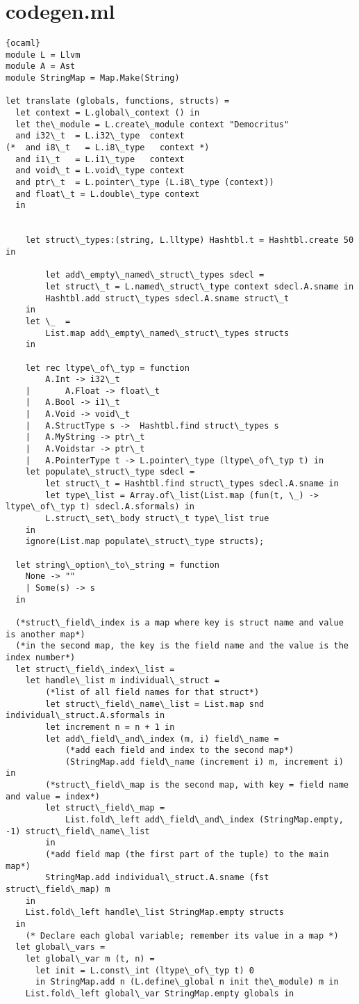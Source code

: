 \section{codegen.ml}
\begin{lstlisting}{ocaml}
module L = Llvm
module A = Ast
module StringMap = Map.Make(String)

let translate (globals, functions, structs) =
  let context = L.global\_context () in
  let the\_module = L.create\_module context "Democritus"
  and i32\_t  = L.i32\_type  context
(*  and i8\_t   = L.i8\_type   context *)
  and i1\_t   = L.i1\_type   context
  and void\_t = L.void\_type context
  and ptr\_t  = L.pointer\_type (L.i8\_type (context)) 
  and float\_t = L.double\_type context
  in
		

	let struct\_types:(string, L.lltype) Hashtbl.t = Hashtbl.create 50 in

        let add\_empty\_named\_struct\_types sdecl =
		let struct\_t = L.named\_struct\_type context sdecl.A.sname in
		Hashtbl.add struct\_types sdecl.A.sname struct\_t
	in
	let \_  =
		List.map add\_empty\_named\_struct\_types structs 
	in

	let rec ltype\_of\_typ = function
		A.Int -> i32\_t
	|       A.Float -> float\_t
	| 	A.Bool -> i1\_t
 	|	A.Void -> void\_t
	| 	A.StructType s ->  Hashtbl.find struct\_types s
	|	A.MyString -> ptr\_t 
	| 	A.Voidstar -> ptr\_t 
	|	A.PointerType t -> L.pointer\_type (ltype\_of\_typ t) in 
	let populate\_struct\_type sdecl = 
		let struct\_t = Hashtbl.find struct\_types sdecl.A.sname in
		let type\_list = Array.of\_list(List.map (fun(t, \_) -> ltype\_of\_typ t) sdecl.A.sformals) in
		L.struct\_set\_body struct\_t type\_list true
	in 
    ignore(List.map populate\_struct\_type structs);
  
  let string\_option\_to\_string = function
	None -> ""
	| Some(s) -> s
  in
	
  (*struct\_field\_index is a map where key is struct name and value is another map*)
  (*in the second map, the key is the field name and the value is the index number*)
  let struct\_field\_index\_list =
	let handle\_list m individual\_struct = 
		(*list of all field names for that struct*) 
		let struct\_field\_name\_list = List.map snd individual\_struct.A.sformals in
		let increment n = n + 1 in
		let add\_field\_and\_index (m, i) field\_name =
			(*add each field and index to the second map*)
			(StringMap.add field\_name (increment i) m, increment i) in
		(*struct\_field\_map is the second map, with key = field name and value = index*)
		let struct\_field\_map = 
			List.fold\_left add\_field\_and\_index (StringMap.empty, -1) struct\_field\_name\_list
		in
		(*add field map (the first part of the tuple) to the main map*)
		StringMap.add individual\_struct.A.sname (fst struct\_field\_map) m	
	in
	List.fold\_left handle\_list StringMap.empty structs	
  in
    (* Declare each global variable; remember its value in a map *)
  let global\_vars =
    let global\_var m (t, n) =
      let init = L.const\_int (ltype\_of\_typ t) 0
      in StringMap.add n (L.define\_global n init the\_module) m in
    List.fold\_left global\_var StringMap.empty globals in


\end{lstlisting}
